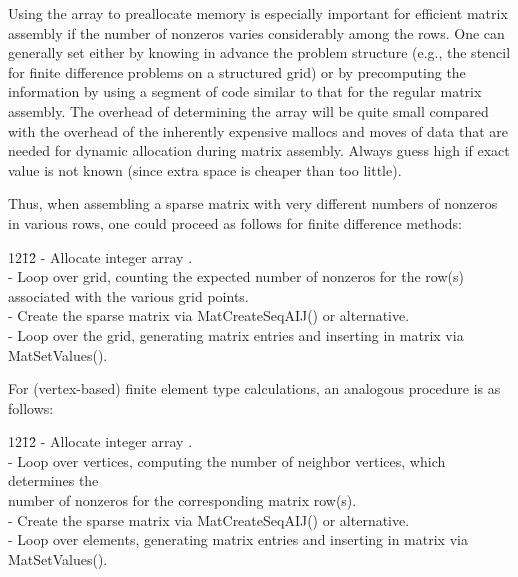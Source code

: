 Using the array  to preallocate memory is especially
important for efficient matrix assembly if the number of nonzeros
varies considerably among the rows.  One can generally set 
either by knowing in advance the problem structure (e.g., the stencil
for finite difference problems on a structured grid) or by
precomputing the information by using a segment of code similar to
that for the regular matrix assembly.  The overhead of determining the
 array will be quite small compared with the overhead of the
inherently expensive mallocs and moves of data that are needed for
dynamic allocation during matrix assembly. Always guess high if exact
value is not known (since extra space is cheaper than too little).

Thus, when assembling a sparse matrix with very different
numbers of nonzeros in various rows, one could proceed
as follows for finite difference methods:
\begin{tabbing}
12\=12\= \kill
    \> - Allocate integer array .\\
    \> - Loop over grid, counting the expected number of nonzeros for the row(s)\\
    \>\>  associated with the various grid points.\\
    \> - Create the sparse matrix via MatCreateSeqAIJ() or alternative.\\
    \> - Loop over the grid, generating matrix entries and inserting
      in matrix via MatSetValues().\\
  \end{tabbing}
\vspace{-0.2in}
For (vertex-based) finite element type calculations, an analogous procedure is as follows:
  \begin{tabbing}
12\=12\= \kill
    \> - Allocate integer array .\\
    \>- Loop over vertices, computing the number of neighbor vertices, which determines the\\
    \>\> number of nonzeros for the corresponding matrix row(s).\\
    \> - Create the sparse matrix via MatCreateSeqAIJ() or alternative.\\
    \> - Loop over elements, generating matrix entries and inserting
      in matrix via MatSetValues().\\
  \end{tabbing}

